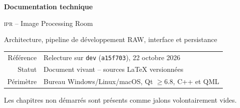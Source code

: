 \documentclass[12pt,a4paper,oneside]{report}
\newcommand{\IPR}{\textsc{ipr}}
\begin{document}
\begin{titlepage}
\centering
\vspace*{2.7cm}
{\Huge\bfseries Documentation technique\par}
\vspace{0.35cm}
{\LARGE \IPR{} -- Image Processing Room\par}
\vspace{1.2cm}
{\large Architecture, pipeline de développement RAW, interface et persistance\par}
\vfill
\begin{tabular}{rl}
Référence & Relecture sur \texttt{dev} (\texttt{a15f703}), 22 octobre 2026\\
Statut & Document vivant -- sources LaTeX versionnées\\
Périmètre & Bureau Windows/Linux/macOS, Qt $\geq 6.8$, C++ et QML
\end{tabular}
\vfill
{\small Les chapitres non démarrés sont présents comme jalons volontairement vides.}
\end{titlepage}

\hypersetup{pageanchor=true}
\tableofcontents
\clearpage
{}













\clearpage
{}


\end{document}

